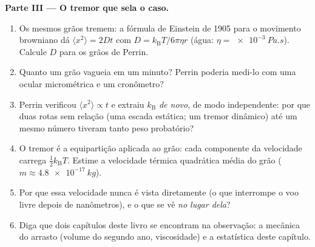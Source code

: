 \begin{problem}
\medskip\noindent\textbf{Parte III --- O tremor que sela o caso.}
\begin{enumerate}[resume]
  \item Os mesmos grãos tremem: a fórmula de Einstein de 1905 para o
        movimento browniano dá $\langle x^2\rangle = 2Dt$ com $D =
        k_{\text{B}}T/6\pi\eta r$ (água: $\eta =
        \qty{e-3}{Pa.s}$). Calcule $D$ para os grãos de Perrin.
  \item Quanto um grão vagueia em um minuto? Perrin poderia medi-lo
        com uma ocular micrométrica e um cronômetro?
  \item Perrin verificou $\langle x^2\rangle \propto t$ e extraiu
        $k_{\text{B}}$ \emph{de novo}, de modo independente: por que
        duas rotas sem relação (uma escada estática; um tremor
        dinâmico) até um mesmo número tiveram tanto peso probatório?
  \item O tremor é a equipartição aplicada ao grão: cada componente da
        velocidade carrega $\tfrac12 k_{\text{B}}T$. Estime a
        velocidade térmica quadrática média do grão ($m \approx
        \qty{4.8e-17}{kg}$).
  \item Por que essa velocidade nunca é vista diretamente (o que
        interrompe o voo livre depois de nanômetros), e o que se vê
        \emph{no lugar dela}?
  \item Diga que dois capítulos deste livro se encontram na
        observação: a mecânica do arrasto (volume do segundo ano,
        viscosidade) e a estatística deste capítulo.
\end{enumerate}


\end{problem}
